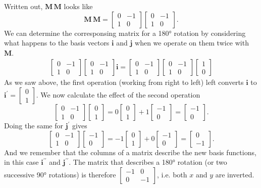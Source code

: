 \documentclass[a4paper]{article}
\newcommand{\bvec}[1]{\mathbf{#1}}
\newcommand{\cvec}[2]{\begin{bmatrix}#1\\#2\end{bmatrix}}
\begin{document}
Written out, $\bvec{M}\,\bvec{M}$ looks like
\begin{equation*}
\bvec{M}\,\bvec{M}= \begin{bmatrix}0 & -1\\ 1 & 0\end{bmatrix}\begin{bmatrix}0 & -1\\ 1 & 0\end{bmatrix}.
\end{equation*}
We can determine the corresponsing matrix for a \ang{180} rotation by considering what happens to the basis vectors $\bvec{i}$ and $\bvec{j}$ when we operate on them twice with $\bvec{M}$.
\begin{eqnarray*}
\begin{bmatrix}0 & -1\\ 1 & 0\end{bmatrix}\begin{bmatrix}0 & -1\\ 1 & 0\end{bmatrix}\bvec{i} = \begin{bmatrix}0 & -1\\ 1 & 0\end{bmatrix}\begin{bmatrix}0 & -1\\ 1 & 0\end{bmatrix}\cvec{1}{0}
\end{eqnarray*}
As we saw above, the first operation (working from right to left) left converts $\bvec{i}$ to $\bvec{i^\prime}=\cvec{0}{1}$. We now calculate the effect of the second operation
\begin{equation}
\begin{bmatrix}0 & -1\\ 1 & 0\end{bmatrix}\cvec{0}{1} = 0\cvec{0}{1} + 1\cvec{-1}{0} = \cvec{-1}{0}.
\end{equation}
Doing the same for $\bvec{j^\prime}$ gives
\begin{equation}
\begin{bmatrix}0 & -1\\ 1 & 0\end{bmatrix}\cvec{-1}{0} = -1\cvec{0}{1} + 0\cvec{-1}{0} = \cvec{0}{-1}.
\end{equation}
And we remember that the columns of a matrix describe the new basis functions, in this case $\bvec{i^{\prime\prime}}$ and $\bvec{j^{\prime\prime}}$. The matrix that describes a \ang{180} rotation (or two successive \ang{90} rotations) is therefore $\begin{bmatrix}-1 & 0\\ 0 & -1\end{bmatrix}$, i.e. both $x$ and $y$ are inverted.
\end{document}
